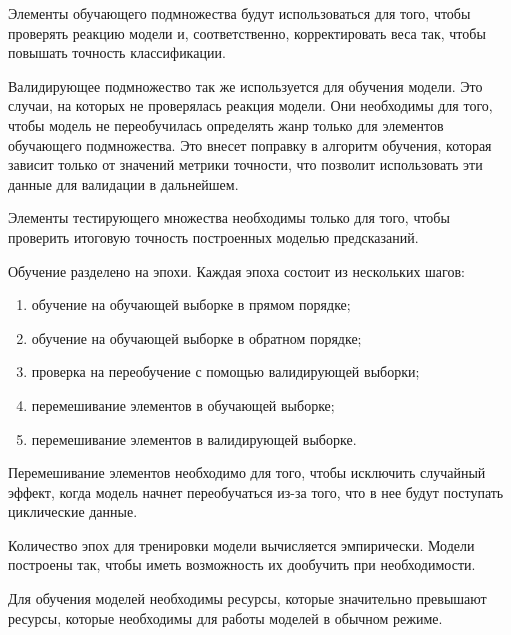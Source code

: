 Элементы обучающего подмножества будут использоваться для того, чтобы проверять реакцию модели и, соответственно, корректировать веса так, чтобы повышать точность классификации.

Валидирующее подмножество так же используется для обучения модели. Это случаи, на которых не проверялась реакция модели. Они необходимы для того, чтобы модель не переобучилась определять жанр только для элементов обучающего подмножества. Это внесет поправку в алгоритм обучения, которая зависит только от значений метрики точности, что позволит использовать эти данные для валидации в дальнейшем.

Элементы тестирующего множества необходимы только для того, чтобы проверить итоговую точность построенных моделью предсказаний.

Обучение разделено на эпохи. Каждая эпоха состоит из нескольких шагов:
\begin{enumerate}
  \item обучение на обучающей выборке в прямом порядке;
  \item обучение на обучающей выборке в обратном порядке;
  \item проверка на переобучение с помощью валидирующей выборки;
  \item перемешивание элементов в обучающей выборке;
  \item перемешивание элементов в валидирующей выборке.
\end{enumerate}

Перемешивание элементов необходимо для того, чтобы исключить случайный эффект, когда модель начнет переобучаться из-за того, что в нее будут поступать циклические данные.

Количество эпох для тренировки модели вычисляется эмпирически. Модели построены так, чтобы иметь возможность их дообучить при необходимости.

Для обучения моделей необходимы ресурсы, которые значительно превышают ресурсы, которые необходимы для работы моделей в обычном режиме.
